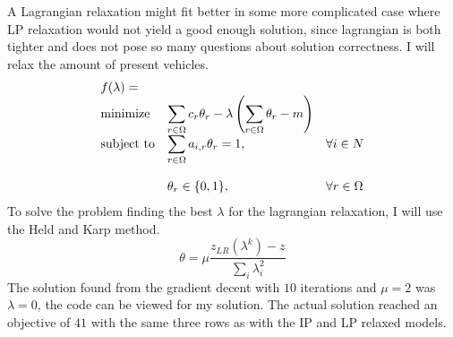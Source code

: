 \documentclass{article}
\begin{document}
    A Lagrangian relaxation might fit better in some more complicated case where LP relaxation would not yield a good enough solution, since lagrangian is both tighter and does not pose so many questions about solution correctness.
    I will relax the amount of present vehicles.
    \begin{equation*}
        \begin{array}{ll@{}ll}
            f(\lambda) =& \\
            \text{minimize}  & \displaystyle\sum_{r \in \Omega} c_r \theta_r - \lambda \left( \sum_{r \in \Omega} \theta_r - m \right)& &\\
            \text{subject to}& \displaystyle\sum_{r \in \Omega} a_{i, r} \theta_r = 1 ,&   &\forall i \in N\\\\
            & \displaystyle \theta_r  \in \{0,1\},  && \forall r \in \Omega
        \end{array}
    \end{equation*}
    To solve the problem finding the best $\lambda$ for the lagrangian relaxation, I will use the Held and Karp method.
    \[
        \theta = \mu \frac{z_{LR}(\lambda^k) - z}{\sum_i \lambda^2_i}
    \]
    The solution found from the gradient decent with $10$ iterations and $\mu=2$ was $\lambda = 0$, the code can be viewed for my solution.
    The actual solution reached an objective of $41$ with the same three rows as with the IP and LP relaxed models.
    \clearpage
\end{document}
